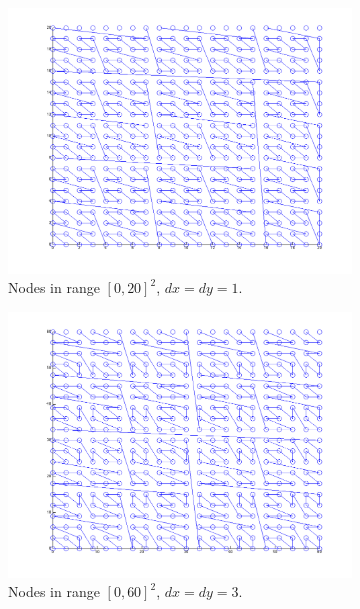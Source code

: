 \documentclass{report}
\begin{document}
\begin{figure}
\begin{subfigure}[t]{0.5\textwidth}
\includegraphics[width=\textwidth]{stencils_content/20x20.png}
\caption{Nodes in range $[0,20]^2$, $dx = dy = 1$.}
\label{fig:connor_works}
\end{subfigure}
\begin{subfigure}[t]{0.5\textwidth}
\includegraphics[width=\textwidth]{stencils_content/scale3.png}
\caption{Nodes in range $[0,60]^2$, $dx = dy = 3$.}
\label{fig:connor_works2}
\end{subfigure}
\begin{subfigure}[t]{0.5\textwidth}

\end{subfigure}
\end{figure}
\end{document}
